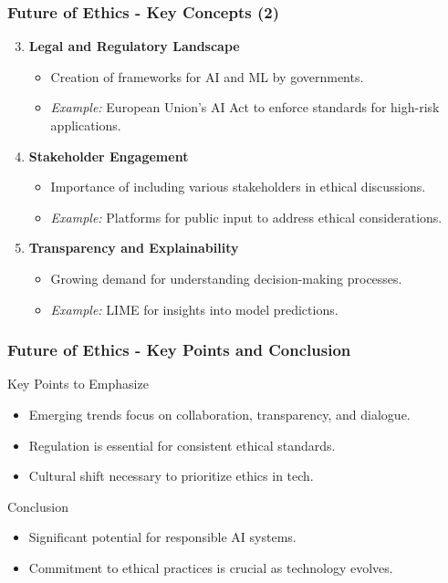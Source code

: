 \documentclass{beamer}
\begin{document}
\begin{frame}[fragile]
    \frametitle{Future of Ethics - Key Concepts (2)}
    \begin{enumerate}
        \setcounter{enumi}{2} %
        \item \textbf{Legal and Regulatory Landscape}
            \begin{itemize}
                \item Creation of frameworks for AI and ML by governments.
                \item \textit{Example:} European Union's AI Act to enforce standards for high-risk applications.
            \end{itemize}
        
        \item \textbf{Stakeholder Engagement}
            \begin{itemize}
                \item Importance of including various stakeholders in ethical discussions.
                \item \textit{Example:} Platforms for public input to address ethical considerations.
            \end{itemize}

        \item \textbf{Transparency and Explainability}
            \begin{itemize}
                \item Growing demand for understanding decision-making processes.
                \item \textit{Example:} LIME for insights into model predictions.
            \end{itemize}
    \end{enumerate}
\end{frame}

\begin{frame}[fragile]
    \frametitle{Future of Ethics - Key Points and Conclusion}
    \begin{block}{Key Points to Emphasize}
        \begin{itemize}
            \item Emerging trends focus on collaboration, transparency, and dialogue.
            \item Regulation is essential for consistent ethical standards.
            \item Cultural shift necessary to prioritize ethics in tech.
        \end{itemize}
    \end{block}

    \begin{block}{Conclusion}
        \begin{itemize}
            \item Significant potential for responsible AI systems.
            \item Commitment to ethical practices is crucial as technology evolves.
        \end{itemize}
    \end{block}
\end{frame}
\end{document}
